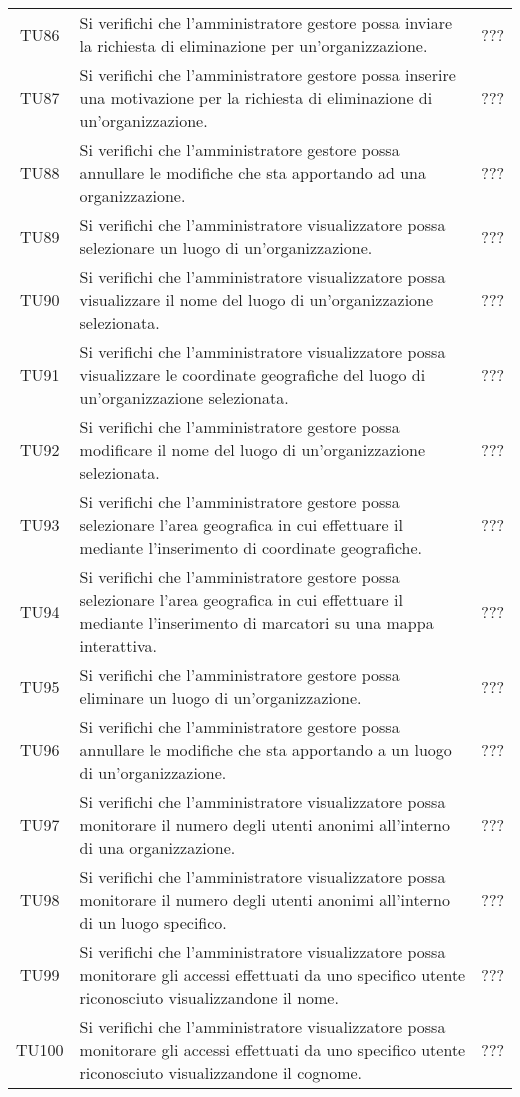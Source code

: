 {\begin{longtable}{ c C{13cm} C{1cm}}
TU86 & Si verifichi che l'amministratore gestore possa inviare la richiesta di eliminazione per un'organizzazione. & ??? \\
TU87 & Si verifichi che l'amministratore gestore possa inserire una motivazione per la richiesta di eliminazione di un'organizzazione. & ??? \\
TU88 & Si verifichi che l'amministratore gestore possa annullare le modifiche che sta apportando ad una organizzazione. & ??? \\
TU89 & Si verifichi che l’amministratore visualizzatore possa selezionare un luogo di un’organizzazione. & ??? \\
TU90 & Si verifichi che l'amministratore visualizzatore possa visualizzare il nome del luogo di un’organizzazione selezionata. & ??? \\
TU91 & Si verifichi che l'amministratore visualizzatore possa visualizzare le coordinate geografiche del luogo di un’organizzazione selezionata. & ??? \\
TU92 & Si verifichi che l'amministratore gestore possa modificare il nome del luogo di un’organizzazione selezionata. & ??? \\
TU93 & Si verifichi che l'amministratore gestore possa selezionare l'area geografica in cui effettuare il  mediante l'inserimento di coordinate geografiche. & ??? \\
TU94 & Si verifichi che l'amministratore gestore possa selezionare l'area geografica in cui effettuare il  mediante l'inserimento di marcatori su una mappa interattiva. & ??? \\
TU95 & Si verifichi che l'amministratore gestore possa eliminare un luogo di un’organizzazione. & ??? \\
TU96 & Si verifichi che l'amministratore gestore possa annullare le modifiche che sta apportando a un luogo di un’organizzazione.  & ??? \\
TU97 & Si verifichi che l’amministratore visualizzatore possa monitorare il numero degli utenti anonimi all’interno di una organizzazione. & ??? \\
TU98 & Si verifichi che l’amministratore visualizzatore possa monitorare il numero degli utenti anonimi all’interno di un luogo specifico. & ??? \\
TU99 & Si verifichi che l’amministratore visualizzatore possa monitorare gli accessi effettuati da uno specifico utente riconosciuto visualizzandone il nome. & ??? \\
TU100 & Si verifichi che l’amministratore visualizzatore possa monitorare gli accessi effettuati da uno specifico utente riconosciuto visualizzandone il cognome. & ??? \\

\end{longtable}}
